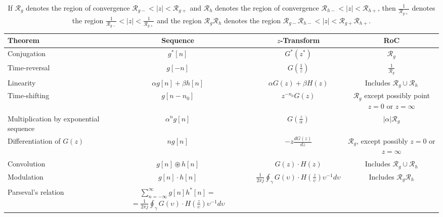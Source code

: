 \documentclass[\documentfontsize, twocolumn]{\classname}
\begin{document}
\begin{table*}[ht]
\centering
\begin{tabular}{l|ccc}
    \textbf{Theorem} & \textbf{Sequence} & \textbf{$z$-Transform} & \textbf{RoC} \\
    \hline
    Conjugation & $g^*[n]$ & $G^*(z^*)$ & $\mathcal R_g$\\
    Time-reversal & $g[-n]$ & $G(\frac{1}{z})$ & $\frac{1}{\mathcal R_g}$\\
    Linearity & $\alpha g[n] + \beta h[n]$ & $\alpha G(z) + \beta H(z)$ & \makecell{Includes\\ $\mathcal R_g \cup \mathcal R_h$}\\
    Time-shifting & $g[n - n_0]$ & $z^{-n_0}G(z)$ & \makecell{$\mathcal R_g$ except possibly\\ point $z=0$ or $z = \infty$}\\
    Multiplication by exponential sequence & $\alpha^n g[n]$ & $G(\frac z \alpha)$ & $|\alpha|\mathcal R_g$\\
    Differentiation of $G(z)$ & $n g[n]$ & $-z\frac{dG(z)}{dz}$ & \makecell{$\mathcal R_g$, except\\ possibly $z=0$ or $z=\infty$}\\
    Convolution & $g[n] \circledast h[n]$ & $G(z)\cdot H(z)$ & \makecell{Includes\\ $\mathcal R_g \cup \mathcal R_h$}\\
    Modulation & $g[n] \cdot h[n]$ & $\frac{1}{2\pi j} \oint_\gamma G(\upsilon)\cdot H(\frac{z}{\upsilon})\upsilon^{-1} d\upsilon$ & \makecell{Includes\\ $\mathcal R_g \mathcal R_h$}\\
    \hline
    Parseval's relation & \makecell{$\sum_{n=-\infty}^\infty g[n]h^*[n] =$ \\ $= \frac{1}{2\pi j} \oint_\gamma G(\upsilon)\cdot H(\frac{z}{\upsilon})\upsilon^{-1} d\upsilon$} & &
\end{tabular}
    \caption{If $\mathcal R_g$ denotes the region of convergence $\mathcal R_{g-} < |z| < \mathcal R_{g+}$ and $\mathcal R_h$ denotes the region of convergence $\mathcal R_{h-} < |z| < \mathcal R_{h+}$, then $\frac{1}{\mathcal R_{g+}}$ denotes the region $\frac{1}{\mathcal R_{g-}} < |z| < \frac{1}{\mathcal R_{g+}}$ and the region $\mathcal R_g \mathcal R_h$ denotes the region $\mathcal R_{g-}\mathcal R_{h-} < |z| < \mathcal R_{g+}\mathcal R_{h+}$.}\label{tab:zTransformTheorems}
\end{table*}
\end{document}
